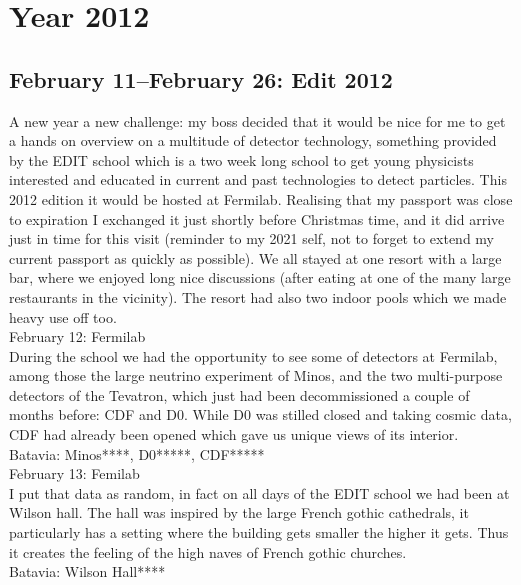 \chapter{Year 2012}
\label{2012}

\section{February 11--February 26: Edit 2012}
\label{2012:EDIT}

A new year a new challenge: my boss decided that it would be nice for me to get a hands on overview on a multitude of detector technology, something provided by the EDIT school which is a two week long school to get young physicists interested and educated in current and past technologies to detect particles. This 2012 edition it would be hosted at Fermilab. Realising that my passport was close to expiration I exchanged it just shortly before Christmas time, and it did arrive just in time for this visit (reminder to my 2021 self, not to forget to extend my current passport as quickly as possible). We all stayed at one resort with a large bar, where we enjoyed long nice discussions (after eating at one of the many large restaurants in the vicinity). The resort had also two indoor pools which we made heavy use off too.\\

February 12: Fermilab\\
During the school we had the opportunity to see some of detectors at Fermilab, among those the large neutrino experiment of Minos, and the two multi-purpose detectors of the Tevatron, which just had been decommissioned a couple of months before: CDF and D0. While D0 was stilled closed and taking cosmic data, CDF had already been opened which gave us unique views of its interior.\\

Batavia: Minos****, D0*****, CDF*****\\

February 13: Femilab\\
I put that data as random, in fact on all days of the EDIT school we had been at Wilson hall. The hall was inspired by the large French gothic cathedrals, it particularly has a setting where the building gets smaller the higher it gets. Thus it creates the feeling of the high naves of French gothic churches.\\

Batavia: Wilson Hall****\\

